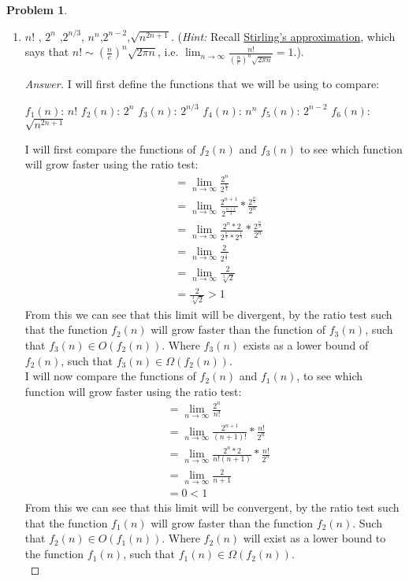 \documentclass[11pt]{article}
\theoremstyle{definition}
\theoremstyle{definition}
\newtheorem{required}{Problem}
\theoremstyle{definition}
\begin{document}
\begin{required}
\begin{enumerate}[label=(\alph*)]
\subsection{Problem 13\ref{2b}}
        \item \label{2b} $n!$ , \qquad $2^n$ ,\qquad  $2^{n/3}$, \qquad  $n^n$,\qquad $2^{n-2}$,\qquad  $\sqrt{n^{2n+1}}$. (\emph{Hint:} Recall \href{https://en.wikipedia.org/wiki/Stirling\%27s_approximation}{Stirling's approximation}, which says that $n! \sim \left(\frac{n}{e}\right)^n \sqrt{2 \pi n}$, i.e. $\lim_{n \to \infty} \frac{n!}{\left(\frac{n}{e}\right)^n \sqrt{2 \pi n}} = 1$.).
\begin{proof}[Answer]
I will first define the functions that we will be using to compare: \\
\begin{center}
$f_1(n)$: $n!$
$f_2(n)$: $2^n$
$f_3(n)$: $2^{n/3}$
$f_4(n)$: $n^n$
$f_5(n)$: $2^{n-2}$
$f_6(n)$: $\sqrt{n^{2n+1}}$   
\end{center}
I will first compare the functions of $f_2(n)$ and $f_3(n)$ to see which function will grow faster using the ratio test: \\
\begin{align*}
&= \lim_{n \to \infty} \frac{2^{n}}{2^{\frac{n}{3}}} \\
&= \lim_{n \to \infty} \frac{2^{n + 1}}{2^{\frac{n+1}{3}}} * \frac{2^{\frac{n}{3}}}{2^{n}} \\
&= \lim_{n \to \infty} \frac{2^{n} * 2} {2^{\frac{n}{3}} * 2^{\frac{1}{3}}} * \frac{2^{\frac{n}{3}}}{2^{n}} \\
&= \lim_{n \to \infty} \frac{2}{2^{\frac{1}{3}}} \\
&= \lim_{n \to \infty} \frac{2}{\sqrt[3]2} \\
&= \frac{2}{\sqrt[3]2} > 1
\end{align*} 
From this we can see that this limit will be divergent, by the ratio test such that the function $f_2(n)$ will grow faster than the function of $f_3(n)$, such that $f_3(n) \in O(f_2(n))$. Where $f_3(n)$ exists as a lower bound of $f_2(n)$, such that $f_3(n) \in \Omega(f_2(n))$. \\

I will now compare the functions of $f_2(n)$ and $f_1(n)$, to see which function will grow faster using the ratio test: \\
\begin{align*}
&= \lim_{n \to \infty} \frac{2^{n}}{n!} \\
&= \lim_{n \to \infty} \frac{2^{n+1}}{(n+1)!} * \frac{n!}{2^{n}} \\
&= \lim_{n \to \infty} \frac{2^{n} * 2}{n!(n+1)} * \frac{n!}{2^{n}} \\
&= \lim_{n \to \infty} \frac{2}{n+1}\\
&= 0 < 1
\end{align*} 
From this we can see that this limit will be convergent, by the ratio test such that the function $f_1(n)$  will grow faster than the function $f_2(n)$. Such that $f_2(n) \in O(f_1(n))$. Where $f_2(n)$ will exist as a lower bound to the function $f_1(n)$, such that $f_1(n) \in \Omega(f_2(n))$. \\


\end{proof}
\end{enumerate}
\end{required}
\end{document}

